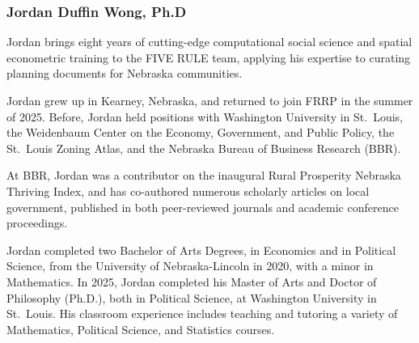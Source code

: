 \documentclass[
  letterpaper,
  DIV=11,
  numbers=noendperiod]{scrartcl}
\begin{document}
\subsubsection*{Jordan Duffin Wong, Ph.D}\label{jordan-duffin-wong-ph.d}

Jordan brings eight years of cutting-edge computational social science
and spatial econometric training to the FIVE RULE team, applying his
expertise to curating planning documents for Nebraska communities.

Jordan grew up in Kearney, Nebraska, and returned to join FRRP in the
summer of 2025. Before, Jordan held positions with Washington University
in St.~Louis, the Weidenbaum Center on the Economy, Government, and
Public Policy, the St.~Louis Zoning Atlas, and the Nebraska Bureau of
Business Research (BBR).

At BBR, Jordan was a contributor on the inaugural Rural Prosperity
Nebraska Thriving Index, and has co-authored numerous scholarly articles
on local government, published in both peer-reviewed journals and
academic conference proceedings.

Jordan completed two Bachelor of Arts Degrees, in Economics and in
Political Science, from the University of Nebraska-Lincoln in 2020, with
a minor in Mathematics. In 2025, Jordan completed his Master of Arts and
Doctor of Philosophy (Ph.D.), both in Political Science, at Washington
University in St.~Louis. His classroom experience includes teaching and
tutoring a variety of Mathematics, Political Science, and Statistics
courses.
\end{document}

